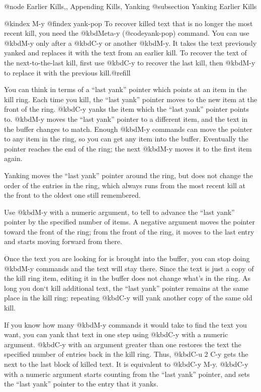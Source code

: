 {{{{@node Earlier Kills,, Appending Kills, Yanking
@subsection Yanking Earlier Kills

@kindex M-y
@findex yank-pop
  To recover killed text that is no longer the most recent kill, you need
the @kbd{Meta-y} (@code{yank-pop}) command.  You can use @kbd{M-y} only
after a @kbd{C-y} or another @kbd{M-y}.  It takes the text previously
yanked and replaces it with the text from an earlier kill.  To recover
the text of the next-to-the-last kill, first use @kbd{C-y} to recover
the last kill, then @kbd{M-y} to replace it with the previous
kill.@refill

  You can think in terms of a ``last yank'' pointer which points at an item
in the kill ring.  Each time you kill, the ``last yank'' pointer moves to
the new item at the front of the ring.  @kbd{C-y} yanks the item
which the ``last yank'' pointer points to.  @kbd{M-y} moves the ``last
yank'' pointer to a different item, and the text in the buffer changes to
match.  Enough @kbd{M-y} commands can move the pointer to any item in the
ring, so you can get any item into the buffer.  Eventually the pointer
reaches the end of the ring; the next @kbd{M-y} moves it to the first item
again.

  Yanking moves the ``last yank'' pointer around the ring, but does not
change the order of the entries in the ring, which always runs from the
most recent kill at the front to the oldest one still remembered.

  Use @kbd{M-y} with a numeric argument, to tell to advance the ``last
yank'' pointer by the specified number of items.  A negative argument
moves the pointer toward the front of the ring; from the front of the
ring, it moves to the last entry and starts moving forward from there.

  Once the text you are looking for is brought into the buffer, you can
stop doing @kbd{M-y} commands and the text will stay there. Since the
text is just a copy of the kill ring item, editing it in the buffer does
not change what's in the ring.  As long you don`t kill additional text,
the ``last yank'' pointer remains at the same place in the kill ring:
repeating @kbd{C-y} will yank another copy of the same old kill.

  If you know how many @kbd{M-y} commands it would take to find the
text you want, you can yank that text in one step using @kbd{C-y} with
a numeric argument.  @kbd{C-y} with an argument greater than one
restores the text the specified number of entries back in the kill
ring.  Thus, @kbd{C-u 2 C-y} gets the next to the last block of killed
text.  It is equivalent to @kbd{C-y M-y}.  @kbd{C-y} with a numeric
argument starts counting from the ``last yank'' pointer, and sets the
``last yank'' pointer to the entry that it yanks.

}}}}
